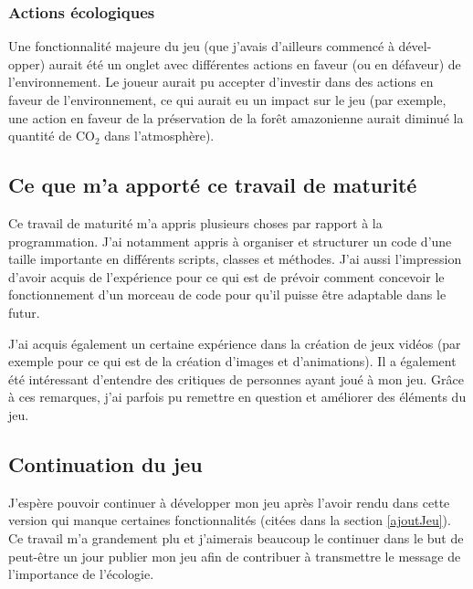 \documentclass{article}
\begin{document}
		\subsubsection{Actions écologiques}
		Une fonctionnalité majeure du jeu (que j'avais d'ailleurs commencé à dével-\\opper) aurait été un onglet avec différentes actions en faveur (ou en défaveur) de l'environnement. Le joueur aurait pu accepter d'investir dans des actions en faveur de l'environnement, ce qui aurait eu un impact sur le jeu (par exemple, une action en faveur de la préservation de la forêt amazonienne aurait diminué la quantité de CO$_{2}$ dans l'atmosphère).

				
		\subsection{Ce que m'a apporté ce travail de maturité}
		Ce travail de maturité m'a appris plusieurs choses par rapport à la programmation. J'ai notamment appris à organiser et structurer un code d'une taille importante en différents scripts, classes et méthodes. J'ai aussi l'impression d'avoir acquis de l'expérience pour ce qui est de prévoir comment concevoir le fonctionnement d'un morceau de code pour qu'il puisse être adaptable dans le futur.
		
		
		J'ai acquis également un certaine expérience dans la création de jeux vidéos (par exemple pour ce qui est de la création d'images et d'animations). Il a également été intéressant d'entendre des critiques de personnes ayant joué à mon jeu. Grâce à ces remarques, j'ai parfois pu remettre en question et améliorer des éléments du jeu.
		
		\subsection{Continuation du jeu}
		J'espère pouvoir continuer à développer mon jeu après l'avoir rendu dans cette version qui manque certaines fonctionnalités (citées dans la section \ref{ajoutJeu}). Ce travail m'a grandement plu et j'aimerais beaucoup le continuer dans le but de peut-être un jour publier mon jeu afin de contribuer à transmettre le message de l'importance de l'écologie.
        
\end{document}

